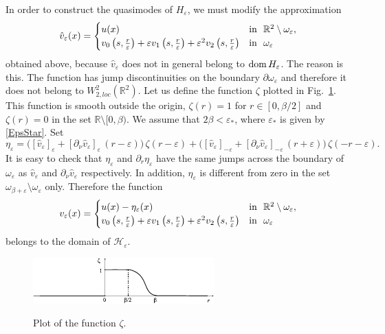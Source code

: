 \documentclass[reqno]{amsart}
\theoremstyle{plain}
\numberwithin{equation}{section}
\newcommand{\dom}{\mathop{\rm dom}}
\newcommand{\Real}{\mathbb R}
\newcommand{\eps}{\varepsilon}
\newcommand{\cH}{\mathcal{H}}
\newcommand\nep{\textstyle\frac r\eps}
\begin{document}
In order to construct the quasimodes of $H_\eps$, we must modify the approximation
\begin{equation}\label{AsymptoticsVhate}
 \hat{v}_\eps(x)=
\begin{cases}
  u(x)& \hbox{in \ }\Real^2\setminus \omega_\eps, \\
    v_0\left(s,\nep\right)+\eps v_1\left(s,\nep\right)+\eps^2 v_2\left(s,\nep\right)
&\hbox{in \ } \omega_\eps
\end{cases}
\end{equation}
obtained above, because $\hat{v}_\eps$ does not in general belong to $\dom H_\eps$. The reason is this. The function  has  jump discontinuities on the boundary $\partial\omega_\eps$ and therefore it does not belong to $W_{2, loc}^2(\Real^2)$.
Let us define the function $\zeta$ plotted in Fig.~\ref{FigPlotZeta}. This function is smooth outside the origin,  $\zeta(r)=1$ for $r\in [0,\beta/2]$ and $\zeta(r)=0$ in the set $\Real\setminus [0,\beta)$.
We  assume that $2\beta<\eps_*$, where $\eps_*$ is given by \eqref{EpsStar}. Set
\begin{equation}\label{EtaEps}
  \eta_\eps=\big([\hat{v}_\eps]_{\eps}+[\partial_\nu\hat{v}_\eps]_{\eps}\,
  (r-\eps)\big)\,\zeta(r-\eps)
  +\big([\hat{v}_\eps]_{-\eps}+[\partial_\nu\hat{v}_\eps]_{-\eps}\,(r+\eps)\big)
  \,\zeta(-r-\eps).
\end{equation}
It is easy to check  that $\eta_\eps$ and $\partial_r\eta_\eps$ have the same jumps across the boundary of $\omega_\eps$ as $\hat{v}_\eps$ and $\partial_\nu\hat{v}_\eps$ respectively. In addition, $\eta_\eps$ is different from zero in the set $\omega_{\beta+\eps}\setminus\omega_\eps$ only. Therefore the function
\begin{equation}\label{AsymptoticsVe}
 v_\eps(x)=
\begin{cases}
  u(x)-\eta_\eps(x)& \hbox{in \ }\Real^2\setminus \omega_\eps, \\
    v_0\left(s,\nep\right)+\eps v_1\left(s,\nep\right)+\eps^2 v_2\left(s,\nep\right)
&\hbox{in \ } \omega_\eps
\end{cases}
\end{equation}
belongs to the domain of $\cH_\eps$.

\begin{figure}[h]
  \centering
  \includegraphics[scale=1.8]{JumpFunction}\\
  \caption{Plot of the function $\zeta$.}\label{FigPlotZeta}
\end{figure}
\end{document}
